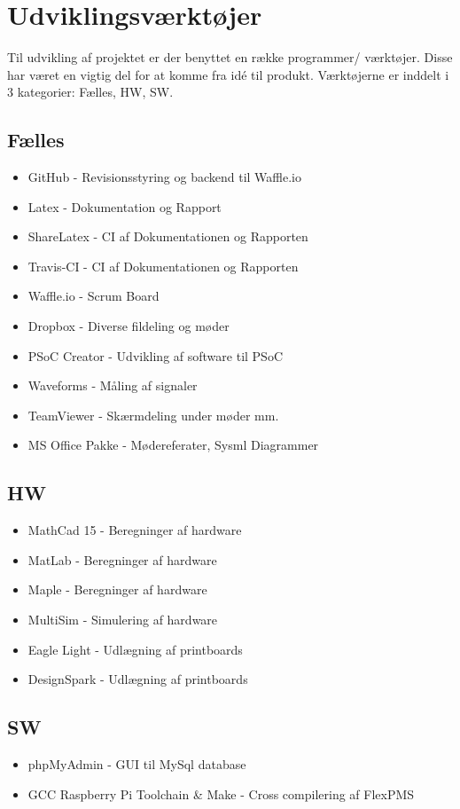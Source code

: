\section{Udviklingsværktøjer}
Til udvikling af projektet er der benyttet en række programmer/ værktøjer. 
Disse har været en vigtig del for at komme fra idé til produkt. 
Værktøjerne er inddelt i 3 kategorier: Fælles, HW, SW.

\subsection{Fælles}
\begin{itemize}
\item GitHub - Revisionsstyring og backend til Waffle.io
\item Latex - Dokumentation og Rapport
\item ShareLatex - CI af Dokumentationen og Rapporten
\item Travis-CI - CI af Dokumentationen og Rapporten
\item Waffle.io - Scrum Board
\item Dropbox - Diverse fildeling og møder
\item PSoC Creator - Udvikling af software til PSoC
\item Waveforms - Måling af signaler
\item TeamViewer - Skærmdeling under møder mm.
\item MS Office Pakke - Mødereferater, Sysml Diagrammer
\end{itemize}

\subsection{HW}
\begin{itemize}
\item MathCad 15 - Beregninger af hardware
\item MatLab - Beregninger af hardware
\item Maple - Beregninger af hardware
\item MultiSim - Simulering af hardware
\item Eagle Light - Udlægning af printboards
\item DesignSpark - Udlægning af printboards
\end{itemize}

\subsection{SW} 
\begin{itemize}
\item phpMyAdmin - GUI til MySql database
\item GCC Raspberry Pi Toolchain \& Make - Cross compilering af FlexPMS
\end{itemize}
